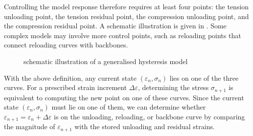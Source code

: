 Controlling the model response therefore requires at least four points: the tension unloading point, the tension residual point, the compression unloading point, and the compression residual point.
A schematic illustration is given in .
Some complex models may involve more control points, such as reloading points that connect reloading curves with backbones.
\begin{figure}[ht]
\centering\footnotesize
{}
\caption{schematic illustration of a generalised hysteresis model}\label{fig:general_hysteresis}
\end{figure}

With the above definition, any current state $(\varepsilon_n,\sigma_n)$ lies on one of the three curves.
For a prescribed strain increment $\Delta\varepsilon$, determining the stress $\sigma_{n+1}$ is equivalent to computing the new point on one of these curves.
Since the current state $(\varepsilon_n,\sigma_n)$ must lie on one of them, we can determine whether $\varepsilon_{n+1}=\varepsilon_n+\Delta\varepsilon$ is on the unloading, reloading, or backbone curve by comparing the magnitude of $\varepsilon_{n+1}$ with the stored unloading and residual strains.

